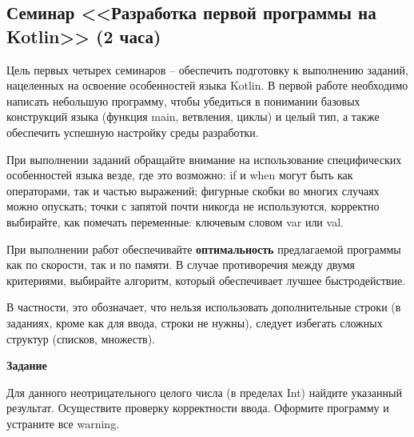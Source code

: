 \subsection{Семинар <<Разработка первой программы на Kotlin>> (2 часа)}

Цель первых четырех семинаров -- обеспечить подготовку к выполнению заданий, 
нацеленных на освоение особенностей языка Kotlin. В первой работе
необходимо написать небольшую программу, чтобы убедиться в понимании
базовых конструкций языка (функция main, ветвления, циклы) и целый тип, а также обеспечить успешную настройку среды разработки.

При выполнении заданий обращайте внимание на использование специфических особенностей языка везде, где это возможно: 
if и when могут быть как операторами, так и частью выражений; фигурные скобки во многих случаях можно опускать;
точки с запятой почти никогда не используются, корректно выбирайте, как помечать переменные: ключевым словом var или val.

При выполнении работ обеспечивайте \textbf{оптимальность} предлагаемой программы как по скорости, так и по памяти. В
случае противоречия между двумя критериями, выбирайте алгоритм, который обеспечивает лучшее быстродействие.

В частности, это обозначает, что нельзя использовать дополнительные строки (в заданиях, кроме как для ввода, строки не нужны),
следует избегать сложных структур (списков, множеств).

\textbf{Задание} %


Для данного неотрицательного целого числа (в пределах Int)
найдите указанный результат. Осуществите проверку 
корректности ввода. Оформите программу и устраните все warning.

